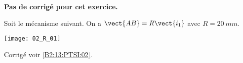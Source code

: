 \normaltrue
\correctionfalse


\setcounter{numques}{0}
\ifcorrection
\else
\textbf{Pas de corrigé pour cet exercice.}
\fi

\ifprof
\else
Soit le mécanisme suivant. On a $\vect{AB}=R\vect{i_1}$ avec $R=\SI{20}{mm}$. 
\begin{center}
\texttt{[image: 02\_R\_01]}
\end{center}
\fi

\ifprof
\else
\fi


\ifprof
\else
\footnotesize

\normalsize

\begin{flushright}
\footnotesize{Corrigé voir \ref{B2:13:PTSI:02}.}
\end{flushright}%
\fi